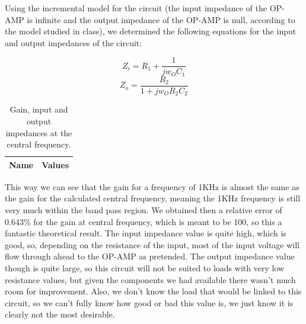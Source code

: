Using the incremental model for the circuit (the input impedance of the OP-AMP is infinite and the output impedance of the OP-AMP is null, according to the model studied in class), we determined the following equations for the input and output impedances of the circuit:

\begin{equation}
Z_i = R_1 + \frac{1}{jw_{O}C_{1}}
\end{equation}
\begin{equation}
Z_o = \frac{R_2}{1+jw_OR_2C_2}
\end{equation}

\begin{table}[h!]
  \centering
  \begin{tabular}{|l|r|}
    \hline    
    {\bf Name} & {\bf Values} \\ \hline
     
  \end{tabular}
  \caption{Gain, input and output impedances at the central frequency.}
  \label{tab:data}
\end{table}

This way we can see that the gain for a frequency of 1KHz is almost the same as the gain for the calculated central frequency, meaning the 1KHz frequency is still very much within the band pass region.
We obtained then a relative error of 0.643\% for the gain at central frequency, which is meant to be 100, so this a 
fantastic theoretical result. The input impedance value is quite high, which is good, so, depending on the resistance of the input, most of the input 
voltage will flow through ahead to the OP-AMP as pretended. The output impedance value though is quite large, so this circuit will not be suited to loads with very low resistance values, but given 
the components we had available there wasn't much room for improvement. Also, we don't know the load that would be linked to this circuit, so we can't fully know how good or bad this value is, 
we just know it is clearly not the most desirable.
